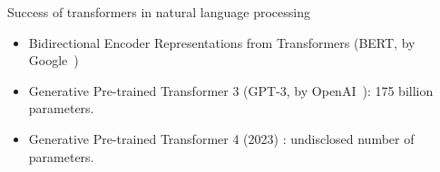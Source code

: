\documentclass[xcolor=pdftex,dvipsnames,table,mathserif]{beamer}
\newcommand{\source}[1]{\begin{textblock*}{4cm}(8.7cm,8.6cm)
    \begin{beamercolorbox}[ht=0.5cm,right]{framesource}
      \usebeamerfont{framesource}\usebeamercolor[fg]{framesource} Credits: {#1}
    \end{beamercolorbox}
\end{textblock*}}
\begin{document}








\begin{frame}{Success of transformers in natural language processing}

  \begin{itemize}
  \item Bidirectional Encoder Representations from Transformers (BERT, by Google~\cite{brown_language_2020})
  \item Generative Pre-trained Transformer 3 (GPT-3, by OpenAI~\cite{devlin_bert_2019}): 175 billion parameters.
  \item Generative Pre-trained Transformer 4 (2023) : undisclosed number of parameters.

  \end{itemize}
\end{frame}


\end{document}

